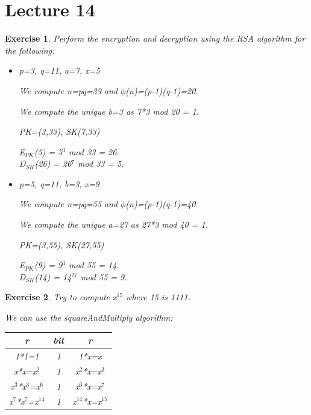 \documentclass[a4paper, 12pt]{report}
\newtheorem{exercise}{\textbf{Exercise}}
\begin{document}
\chapter*{Lecture 14}
\begin{exercise}
	Perform the encryption and decryption using the RSA algorithm for the following:
	\begin{itemize}
		\item p=3, q=11, a=7, x=5
		
		We compute n=pq=33 and $\phi$(n)=(p-1)(q-1)=20.
		
		We compute the unique b=3 as 7*3 mod 20 = 1.
		
		PK=(3,33), SK(7,33)
		
		E$_{PK}$(5) = 5$^3$ mod 33 = 26.\\
		D$_{SK}$(26) = 26$^7$ mod 33 = 5.
		\item p=5, q=11, b=3, x=9
		
		We compute n=pq=55 and $\phi$(n)=(p-1)(q-1)=40.
		
		We compute the unique a=27 as 27*3 mod 40 = 1.
		
		PK=(3,55), SK(27,55)
		
		E$_{PK}$(9) = 9$^3$ mod 55 = 14.\\
		D$_{SK}$(14) = 14$^27$ mod 55 = 9.
	\end{itemize}
\end{exercise}

\begin{exercise}
	Try to compute x$^{15}$ where 15 is 1111.
	
	We can use the squareAndMultiply algorithm:
	
	\begin{table}[H]
		\centering
		\begin{tabular}{|c|c|c|}
			\hline
			\textbf{r} & \textbf{bit} & \textbf{r}\\ \hline
			1*1=1 & 1 & 1*x=x\\
			x*x=x$^2$ & 1 & x$^2$*x=x$^3$\\
			x$^3$*x$^3$=x$^6$ & 1 & x$^6$*x=x$^7$\\
			x$^7$*x$^7$=x$^{14}$ & 1 & x$^{14}$*x=x$^{15}$\\ \hline
		\end{tabular}
	\end{table}
\end{exercise}
\end{document}

